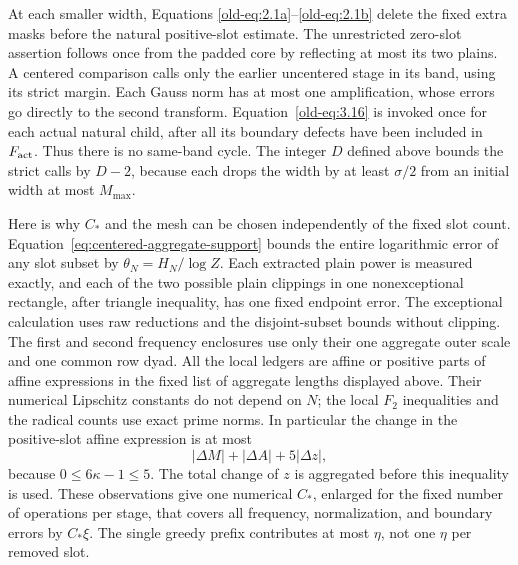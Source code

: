 \documentclass[11pt,a4paper]{article}
\numberwithin{equation}{section}
\numberwithin{figure}{section}
\theoremstyle{definition}
\theoremstyle{remark}
\begin{document}
At each smaller width, Equations
\eqref{old-eq:2.1a}--\eqref{old-eq:2.1b} delete the fixed extra masks
before the natural positive-slot estimate.  The unrestricted zero-slot
assertion follows once from the padded core by reflecting at most its
two plains.  A centered comparison calls only the earlier uncentered
stage in its band, using its strict margin.  Each Gauss norm has at
most one amplification, whose errors go directly to the second
transform.  Equation~\eqref{old-eq:3.16} is invoked once for each
actual natural child, after all its boundary defects have been
included in \(F_{\rm act}\).  Thus there is no same-band cycle.
The integer \(D\) defined above bounds the strict calls by \(D-2\),
because each drops the width by at least \(\sigma/2\) from an initial
width at most \(M_{\max}\).

Here is why \(C_*\) and the mesh can be chosen independently of the
fixed slot count.  Equation~\eqref{eq:centered-aggregate-support}
bounds the entire logarithmic error of any slot subset by
\(\theta_N=H_N/\log Z\).  Each extracted plain power is measured
exactly, and each of the two possible plain clippings in one
nonexceptional rectangle, after triangle inequality, has one fixed
endpoint error.  The exceptional calculation uses raw reductions and
the disjoint-subset bounds without clipping.  The first and second frequency enclosures use only
their one aggregate outer scale and one common row dyad.  All the
local ledgers are affine or positive parts of affine expressions in
the fixed list of aggregate lengths displayed above.  Their numerical
Lipschitz constants do not depend on \(N\); the local \(F_2\)
inequalities and the radical counts use exact prime norms.  In
particular the change in the positive-slot affine expression is at most
\begin{equation}
 |\Delta M|+|\Delta A|+5|\Delta z|,
 \label{old-eq:2.1j}
\end{equation}
because \(0\le6\kappa-1\le5\).  The total change of \(z\) is
aggregated before this inequality is used.  These observations give
one numerical \(C_*\), enlarged for the fixed number of operations
per stage, that covers all frequency, normalization, and boundary
errors by \(C_*\xi\).  The single greedy prefix contributes at
most \(\eta\), not one \(\eta\) per removed slot.
\end{document}
